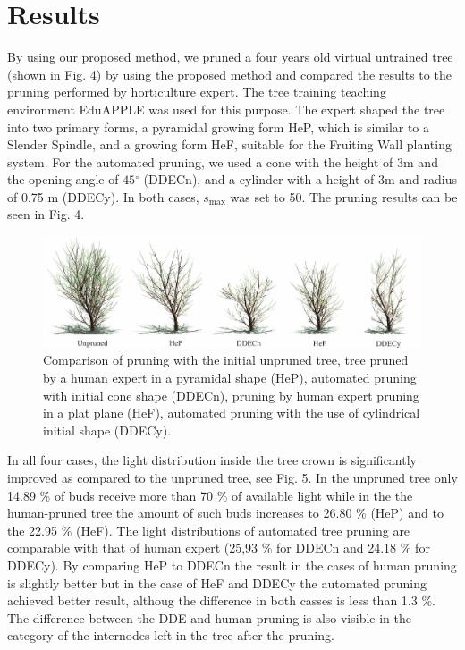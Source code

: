 \documentclass[1p]{elsarticle}
\begin{document}
\section{Results}

By using our proposed method, we pruned a four years old virtual
untrained tree (shown in Fig. 4) by using the proposed method and
compared the results to the pruning performed by horticulture expert.
The tree training teaching environment EduAPPLE \cite{kohek_eduapple:_2015} was used for
this purpose. The expert shaped the tree into two primary forms, a
pyramidal growing form HeP, which is similar to a Slender Spindle, and a
growing form HeF, suitable for the Fruiting Wall planting system. For
the automated pruning, we used a cone with the height of \(3\)m and the
opening angle of \(45{^\circ}\) (DDECn), and a cylinder with a height of
3m and radius of 0.75 m (DDECy). In both cases, \(s_{\mathrm{\max}}\)
was set to 50. The pruning results can be seen in Fig. 4.
\begin{figure}
    \centering
    \includegraphics[width=5.4in]{figs/image4.jpeg}
    \caption{Comparison of pruning with the initial unpruned tree,
tree pruned by a human expert in a pyramidal shape (HeP), automated
pruning with initial cone shape (DDECn), pruning by human expert pruning
in a plat plane (HeF), automated pruning with the use of cylindrical
initial shape (DDECy).}
    \label{fig:my_label}
\end{figure}




In all four cases, the light distribution inside the tree crown is
significantly improved as compared to the unpruned tree, see Fig. 5. In the unpruned
tree only 14.89 \% of buds receive more than 70 \% of available light while in the the human-pruned tree the amount of such buds increases to 26.80 \% (HeP) and to the 22.95 \% (HeF).
The light distributions of automated tree pruning are comparable with
that of human expert (25,93 \% for DDECn and 24.18 \% for DDECy). By comparing HeP to DDECn the result in the cases of human pruning is slightly better but in the case of HeF and DDECy the automated pruning achieved better result, althoug the difference in both casses is less than 1.3 \%. The difference between the DDE
and human pruning is also visible in the category of the internodes left
in the tree after the pruning.
\end{document}
